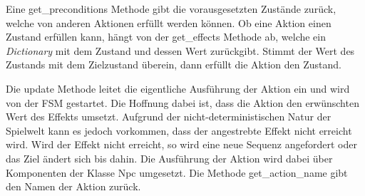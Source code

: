 Eine get\_preconditions Methode gibt die vorausgesetzten Zustände zurück, welche von anderen Aktionen erfüllt werden können. Ob eine Aktion einen Zustand erfüllen kann, hängt von der get\_effects Methode ab, welche ein \textit{Dictionary} mit dem Zustand und dessen Wert zurückgibt. Stimmt der Wert des Zustands mit dem Zielzustand überein, dann erfüllt die Aktion den Zustand.

Die update Methode leitet die eigentliche Ausführung der Aktion ein und wird von der FSM gestartet. Die Hoffnung dabei ist, dass die Aktion den erwünschten Wert des Effekts umsetzt. Aufgrund der nicht-deterministischen Natur der Spielwelt kann es jedoch vorkommen, dass der angestrebte Effekt nicht erreicht wird. Wird der Effekt nicht erreicht, so wird eine neue Sequenz angefordert oder das Ziel ändert sich bis dahin. Die Ausführung der Aktion wird dabei über Komponenten der Klasse Npc umgesetzt. Die Methode get\_action\_name gibt den Namen der Aktion zurück.



